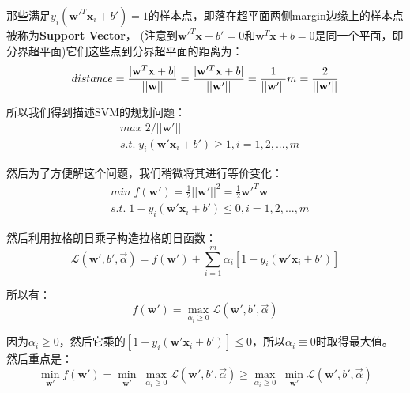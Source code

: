 \documentclass{article}
\begin{document}
那些满足$y_i(\textbf{w}'^T\textbf{x}_i+b')= 1$的样本点，即落在超平面两侧margin边缘上的样本点被称为\textbf{Support Vector}，
(注意到$\textbf{w}'^T\textbf{x}+b'=0$和$\textbf{w}^T\textbf{x}+b=0$是同一个平面，即分界超平面)它们这些点到分界超平面的距离为：
\begin{equation}
	distance=\frac{|\textbf{w}^T\textbf{x}+b|}{||\textbf{w}||}=\frac{|\textbf{w}'^T\textbf{x}+b|}{||\textbf{w}'||}=\frac{1}{||\textbf{w}'||}\\
	m=\frac{2}{||\textbf{w}'||}
\end{equation}

所以我们得到描述SVM的规划问题：
\begin{equation}
	\begin{aligned}
		& max\;2/||\textbf{w}'||\\
		& s.t.\;y_i(\textbf{w}'\textbf{x}_i+b')\geq 1,i=1,2,...,m
	\end{aligned}
\end{equation}

然后为了方便解这个问题，我们稍微将其进行等价变化：
\begin{equation}
	\begin{aligned}
		& min\;f(\textbf{w}')=\frac{1}{2}||\textbf{w}'||^2=\frac{1}{2}\textbf{w}'^T\textbf{w}\\
		& s.t.\;1-y_i(\textbf{w}'\textbf{x}_i+b')\leq 0,i=1,2,...,m
	\end{aligned}
\end{equation}

然后利用拉格朗日乘子构造拉格朗日函数：
\begin{equation}
	\mathcal{L}(\textbf{w}',b',\overrightarrow{\alpha})=f(\textbf{w}')+\sum_{i=1}^m\alpha_i[1-y_i(\textbf{w}'\textbf{x}_i+b')]
\end{equation}

所以有：
\begin{equation}
	f(\textbf{w}')= \mathop{max}\limits_{\alpha_i\geq 0}\mathcal{L}(\textbf{w}',b',\overrightarrow{\alpha})
\end{equation}

因为$\alpha_i\geq 0$，然后它乘的$[1-y_i(\textbf{w}'\textbf{x}_i+b')]\leq 0$，所以$\alpha_i\equiv 0$时取得最大值。
然后重点是：
\begin{equation}
	\mathop{min}\limits_{\textbf{w}'}f(\textbf{w}')=\mathop{min}\limits_{\textbf{w}'}\;\mathop{max}\limits_{\alpha_i\geq 0}\mathcal{L}(\textbf{w}',b',\overrightarrow{\alpha})\geq \mathop{max}\limits_{\alpha_i\geq 0}\;\mathop{min}\limits_{\textbf{w}'}\mathcal{L}(\textbf{w}',b',\overrightarrow{\alpha})
\end{equation}
\end{document}
